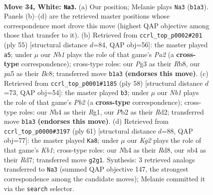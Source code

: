 \documentclass[11pt]{article}
\begin{document}
\begin{figure}[p]
\label{fig:thought-m64}
\end{figure}

\clearpage

\begin{figure}[p]\centering
\begin{subfigure}{0.46\textwidth}\centering
\resizebox{\linewidth}{!}{%
\newchessgame
\chessboard[
  setfen={rnb5/1p4kr/2pqp3/p4p1p/PnpP1P1N/6P1/1P1QB1KP/1N2R2R w - - 0 34},
  showmover=false,
  pgfstyle=straightmove, color=movearrow, markmove={b1-a3}
]}
\caption{}
\end{subfigure}\hfill
\begin{subfigure}{0.46\textwidth}\centering
\resizebox{\linewidth}{!}{%
\newchessgame
\chessboard[
  setfen={1rb2rk1/p4ppp/3q1n2/2pPp3/1pP1P3/6P1/PQN2PBP/2RR2K1 b - - 4 28},
  showmover=false,
  pgfstyle=straightmove, color=movearrow, markmove={a7-a5}
]}
\caption{}
\end{subfigure}
\\[4pt]
\begin{subfigure}{0.46\textwidth}\centering
\resizebox{\linewidth}{!}{%
\newchessgame
\chessboard[
  setfen={2b2k2/5rn1/r2p3q/2p2p1p/p1P1pP2/2Q1N1P1/PP1RB2P/6RK w - - 5 30},
  showmover=false,
  pgfstyle=straightmove, color=movearrow, markmove={b2-b3}
]}
\caption{}
\end{subfigure}\hfill
\begin{subfigure}{0.46\textwidth}\centering
\resizebox{\linewidth}{!}{%
\newchessgame
\chessboard[
  setfen={1k1r4/p2rn3/1pq1bpp1/4p2p/1QP1P2P/2R5/PP3BP1/K1N1R3 b - - 8 31},
  showmover=false,
  pgfstyle=straightmove, color=movearrow, markmove={b8-a8}
]}
\caption{}
\end{subfigure}
\caption{\textbf{Move 34, White: \texttt{Na3}.} (a) Our position; Melanie plays \texttt{Na3} (\texttt{b1a3}). Panels (b)--(d) are the retrieved master positions whose correspondence most drove this move (highest QAP objective among those that transfer to it). (b) Retrieved from \texttt{ccrl\_top\_p0002\#201} (ply 55) [structural distance $d$=84, QAP obj=56]: the master played \texttt{a5}; under $\mu$ our \emph{Nb1} plays the role of that game's \emph{Pa2} (a \textbf{cross-type} correspondence); cross-type roles: our \emph{P}g3 as their \emph{R}b8, our \emph{p}a5 as their \emph{B}c8; transferred move \texttt{b1a3} \textbf{(endorses this move)}. (c) Retrieved from \texttt{ccrl\_top\_p0001\#1185} (ply 58) [structural distance $d$=73, QAP obj=54]: the master played \texttt{b3}; under $\mu$ our \emph{Nb1} plays the role of that game's \emph{Pb2} (a \textbf{cross-type} correspondence); cross-type roles: our \emph{N}h4 as their \emph{R}g1, our \emph{P}b2 as their \emph{R}d2; transferred move \texttt{b1a3} \textbf{(endorses this move)}. (d) Retrieved from \texttt{ccrl\_top\_p0000\#3197} (ply 61) [structural distance $d$=88, QAP obj=77]: the master played \texttt{Ka8}; under $\mu$ our \emph{Kg2} plays the role of that game's \emph{Kb1}; cross-type roles: our \emph{N}h4 as their \emph{R}d8, our \emph{n}b4 as their \emph{R}d7; transferred move \texttt{g2g1}. Synthesis: 3 retrieved analogs transferred to \texttt{Na3} (summed QAP objective 147, the strongest correspondence among the candidate moves); Melanie committed it via the \texttt{search} selector.}

\end{figure}
\end{document}
